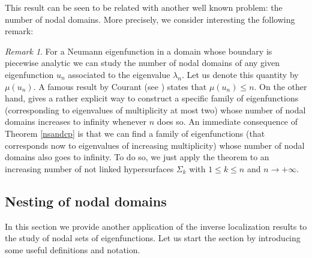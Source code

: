 \documentclass{amsart}
\theoremstyle{definition}
\theoremstyle{remark}
\newtheorem{remark}[theorem]{Remark}
\renewcommand\leq\leqslant
\numberwithin{equation}{section}
\theoremstyle{definition}
\theoremstyle{remark}
\begin{document}
 This result can be seen to be related with another well known problem: the number of nodal domains. More precisely, we consider interesting the following remark:
 \begin{remark}
     For a Neumann eigenfunction in a domain whose boundary is piecewise analytic we can study the number of nodal domains of any given eigenfunction $u_n$ associated to the eigenvalue $\lambda_n$. Let us denote this quantity by $\mu\left(u_n\right)$. A famous result by Courant (see \cite{Courant}) states that $\mu\left(u_n\right)\leq n$. On the other hand, \cite[Proposition 10.6.]{HelfII}
  gives a rather explicit way to construct a specific family of eigenfunctions (corresponding to eigenvalues of multiplicity at most two) whose number of nodal domains increases to infinity whenever $n$ does so. An immediate consequence of Theorem \ref{nsandcp} is that we can find a family of eigenfunctions (that corresponds now to eigenvalues of increasing multiplicity) whose number of nodal domains also goes to infinity. To do so, we just apply the theorem to an increasing number of not linked hypersurfaces $\Sigma_k$ with $1\leq k\leq n$ and $n\rightarrow +\infty$.
  
  \end{remark}

 
\subsection{Nesting of nodal domains}
In this section we provide another application of the inverse localization results to the study of nodal sets of eigenfunctions. Let us start the section by introducing some useful definitions and notation. 
\end{document}
